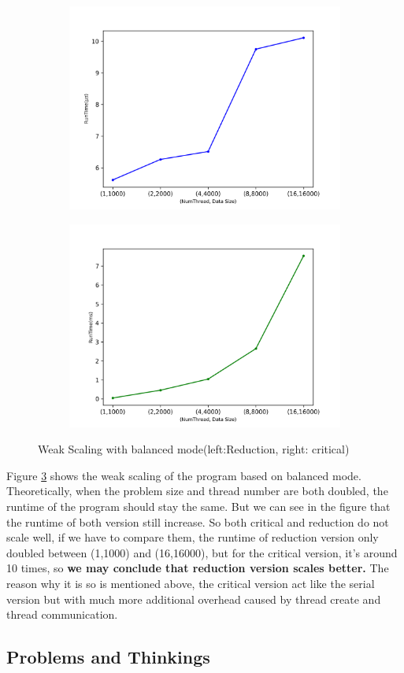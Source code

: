 \documentclass[article]{scrartcl}
\begin{document}
  \begin{figure}[ht]
    \begin{subfigure}
      \centering
      \includegraphics[width=.5\linewidth]{../figs/WeakScaling1_AllinOne.png}  
      \label{fig:WeakScaling1}
    \end{subfigure}
    \begin{subfigure}
      \centering
      \includegraphics[width=.5\linewidth]{../figs/WeakScaling2_AllinOne.png}  
      \label{fig:WeakScaling2}
    \end{subfigure}
    \caption{Weak Scaling with balanced mode(left:Reduction, right: critical)}
    \label{fig:WeakScaling}
    \end{figure}
Figure \ref{fig:WeakScaling} shows the weak scaling of the program based on balanced mode.
Theoretically, when the problem size and thread number are both doubled, the runtime of the program should stay the same.
But we can see in the figure that the runtime of both version still increase. So both critical and reduction do not scale well, if we have to compare them,
the runtime of reduction version only doubled between (1,1000) and (16,16000), but for the critical version, it's around 10 times, so \textbf{we may conclude that reduction
version scales better.} The reason why it is so is mentioned above, the critical version act like the serial version but with much more additional
overhead caused by thread create and thread communication.

\subsection{Problems and Thinkings}
\end{document}
